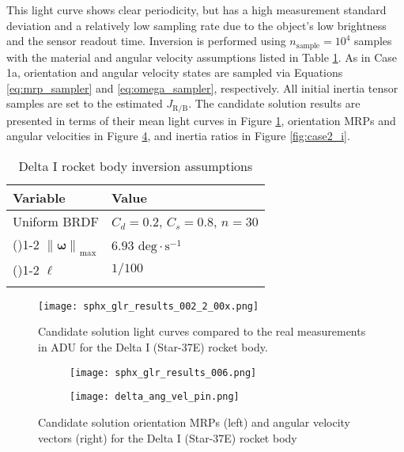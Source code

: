 \documentclass[a4paper,twocolumn]{spaceDebrisC} %
\newcommand{\grule}[0]{\arrayrulecolor{darkgray}\cmidrule(){1-2}}
\newcommand{\brule}[0]{\arrayrulecolor{black} \bottomrule}
\newcommand{\vctr}[1]{\bm{#1}}
\newcommand{\norm}[1]{\left\lVert#1\right\rVert}
\newcommand{\figbig}[0]{0.5\textwidth}
\newcommand{\figmed}[0]{0.4\textwidth}
\begin{document}
This light curve shows clear periodicity, but has a high measurement standard deviation and a relatively low sampling rate due to the object's low brightness and the sensor readout time. Inversion is performed using $n_\text{sample}=10^4$ samples with the material and angular velocity assumptions listed in Table \ref{tb:case2_ass}. As in Case 1a, orientation and angular velocity states are sampled via Equations \ref{eq:mrp_sampler} and \ref{eq:omega_sampler}, respectively. All initial inertia tensor samples are set to the estimated $J_\text{R/B}$. The candidate solution results are presented in terms of their mean light curves in Figure \ref{fig:case2_s}, orientation MRPs and angular velocities in Figure \ref{fig:case2_pw}, and inertia ratios in Figure \ref{fig:case2_i}.

\begin{table}[H]
  \centering
  \renewcommand{\arraystretch}{1.3} %
  \caption{Delta I rocket body inversion assumptions}
  \vspace*{6pt}
  \begin{tabular}{@{} l l @{}}
    \toprule
    Variable & Value \\ \midrule
    Uniform BRDF & $C_d=0.2$, $C_s=0.8$, $n=30$ \\ \grule
    $\norm{\vctr{\omega}}_\text{max}$ & $6.93$ $\text{deg} \cdot \text{s}^{-1}$ \\ \grule
    $\ell$ & $1/100$ \\ \brule
  \end{tabular}
  \label{tb:case2_ass}
\end{table}

\begin{figure}[H]
  \centering
  \texttt{[image: sphx\_glr\_results\_002\_2\_00x.png]}
  \caption{Candidate solution light curves compared to the real measurements in ADU for the Delta I (Star-37E) rocket body.}
  \label{fig:case2_s}
\end{figure}


\begin{figure}[H]
  \centering
  \begin{subfigure}[t]{0.23\textwidth}
    \centering
    \texttt{[image: sphx\_glr\_results\_006.png]}
    \caption{}
    \label{fig:case2_pwa}
  \end{subfigure}
  \hfill
  \begin{subfigure}[t]{0.23\textwidth}
    \centering
    \texttt{[image: delta\_ang\_vel\_pin.png]}
    \caption{}
    \label{fig:case2_pwb}
  \end{subfigure}

  \caption{Candidate solution orientation MRPs (left) and angular velocity vectors (right) for the Delta I (Star-37E) rocket body}
  \label{fig:case2_pw}
\end{figure}
\end{document}
